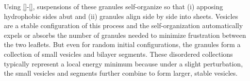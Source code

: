 Using \eqref{}-\eqref{}, suspensions of these granules self-organize
so that (i) apposing hydrophobic sides abut and (ii) granules align
side by side into sheets.  Vesicles are a stable configuration
of this process and the self-organization automatically expels or
absorbs the number of granules needed to minimize frustration between
the two leaflets.  But even for random initial configurations,
the granules form a collection of small vesicles and bilayer segments.
These disordered collections typically represent a local energy minimum 
because under a slight perturbation, the small vesicles and segments
further combine to form larger, stable vesicles.  




%
%
%
%
%
%
